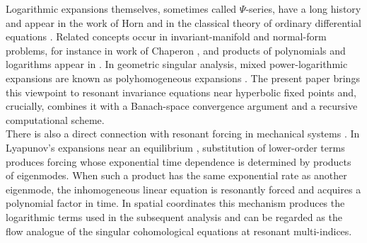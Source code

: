 \documentclass{amsart}
\theoremstyle{plain}
\theoremstyle{definition}
\begin{document}
Logarithmic expansions themselves, sometimes called $\Psi$-series, have a long history and appear in the work of Horn and in the classical theory of ordinary differential equations \cite{horn1896ueber,hille1997ordinary,gavrilov1992non}. Related concepts occur in invariant-manifold and normal-form problems, for instance in work of Chaperon \cite{chaperon1986c,CHAPERON_2004}, and products of polynomials and logarithms appear in \cite{Mourtada91,bonckaert2003linearization}. In geometric singular analysis, mixed power-logarithmic expansions are known as polyhomogeneous expansions \cite{grieser2001basics}. The present paper brings this viewpoint to resonant invariance equations near hyperbolic fixed points and, crucially, combines it with a Banach-space convergence argument and a recursive computational scheme.\\

There is also a direct connection with resonant forcing in mechanical systems \cite{nayfeh2024nonlinear}. In Lyapunov's expansions near an equilibrium \cite{liapounoff1907probleme}, substitution of lower-order terms produces forcing whose exponential time dependence is determined by products of eigenmodes. When such a product has the same exponential rate as another eigenmode, the inhomogeneous linear equation is resonantly forced and acquires a polynomial factor in time. In spatial coordinates this mechanism produces the logarithmic terms used in the subsequent analysis and can be regarded as the flow analogue of the singular cohomological equations at resonant multi-indices.\\
\end{document}
